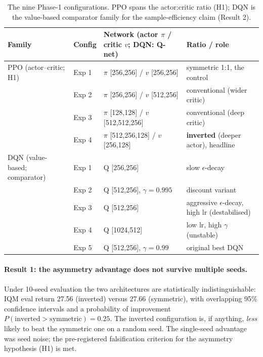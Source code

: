 \documentclass[10pt]{article}
\begin{document}
\begin{table}[t]
\centering
\caption{The nine Phase-1 configurations. PPO spans the actor:critic ratio (H1); DQN is the
value-based comparator family for the sample-efficiency claim (Result 2).}
\label{tab:configs}
\begin{tabular}{>{\raggedright\arraybackslash}p{2.6cm} l >{\raggedright\arraybackslash}p{4.6cm} >{\raggedright\arraybackslash}p{6.2cm}}
\toprule
Family & Config & Network (actor $\pi$ / critic $v$; DQN: Q-net) & Ratio / role \\
\midrule
PPO (actor--critic; H1) & Exp 1 & $\pi$ [256,256] / $v$ [256,256] & symmetric 1:1, the control \\
 & Exp 2 & $\pi$ [256,256] / $v$ [512,256] & conventional (wider critic) \\
 & Exp 3 & $\pi$ [128,128] / $v$ [512,512,256] & conventional (deep critic) \\
 & Exp 4 & $\pi$ [512,256,128] / $v$ [256,128] & \textbf{inverted} (deeper actor), headline \\
\midrule
DQN (value-based; comparator) & Exp 1 & Q [256,256] & slow $\epsilon$-decay \\
 & Exp 2 & Q [512,256], $\gamma=0.995$ & discount variant \\
 & Exp 3 & Q [512,256] & aggressive $\epsilon$-decay, high lr (destabilised) \\
 & Exp 4 & Q [1024,512] & low lr, high $\gamma$ (unstable) \\
 & Exp 5 & Q [512,256], $\gamma=0.99$ & original best DQN \\
\bottomrule
\end{tabular}
\end{table}

\paragraph{Result 1: the asymmetry advantage does not survive multiple seeds.} Under 10-seed
evaluation the two architectures are statistically indistinguishable: IQM eval return
27.56 (inverted) versus 27.66 (symmetric), with overlapping 95\%
confidence intervals and a probability of improvement $P(\text{inverted} >
\text{symmetric}) = \mathbf{0.25}$. The inverted configuration is, if anything, \emph{less}
likely to beat the symmetric one on a random seed. The single-seed advantage was seed noise;
the pre-registered falsification criterion for the asymmetry hypothesis (H1) is met.
\end{document}
